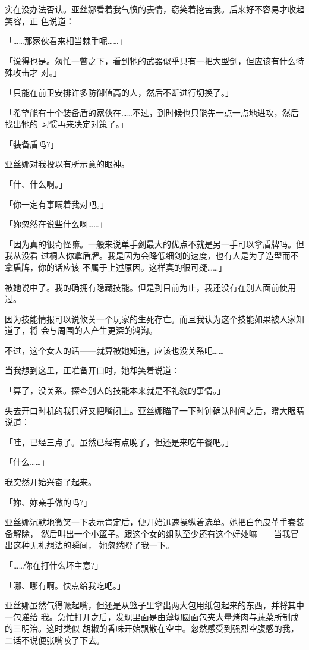 \documentclass[11pt]{book}
\begin{document}
实在没办法否认。亚丝娜看着我气愤的表情，窃笑着挖苦我。后来好不容易才收起笑容，正
色说道：

「……那家伙看来相当棘手呢……」

「说得也是。匆忙一瞥之下，看到牠的武器似乎只有一把大型剑，但应该有什么特殊攻击才
对。」

「只能在前卫安排许多防御值高的人，然后不断进行切换了。」

「希望能有十个装备盾的家伙在……不过，到时候也只能先一点一点地进攻，然后找出牠的
习惯再来决定对策了。」

「装备盾吗?」

亚丝娜对我投以有所示意的眼神。

「什、什么啊。」

「你一定有事瞒着我对吧。」

「妳忽然在说些什么啊……」

「因为真的很奇怪嘛。一般来说单手剑最大的优点不就是另一手可以拿盾牌吗。但我从没看
过桐人你拿盾牌。我是因为会降低细剑的速度，也有人是为了造型而不拿盾牌，你的话应该
不属于上述原因。这样真的很可疑……」

被她说中了。我的确拥有隐藏技能。但是到目前为止，我还没有在别人面前使用过。

因为技能情报可以说攸关一个玩家的生死存亡。而且我认为这个技能如果被人家知道了，将
会与周围的人产生更深的鸿沟。

不过，这个女人的话——就算被她知道，应该也没关系吧……

当我想到这里，正准备开口时，她却笑着说道：

「算了，没关系。探查别人的技能本来就是不礼貌的事情。」

失去开口时机的我只好又把嘴闭上。亚丝娜瞄了一下时钟确认时间之后，瞪大眼睛说道：

「哇，已经三点了。虽然已经有点晚了，但还是来吃午餐吧。」

「什么……」

我突然开始兴奋了起来。

「妳、妳亲手做的吗?」

亚丝娜沉默地微笑一下表示肯定后，便开始迅速操纵着选单。她把白色皮革手套装备解除，
然后叫出一个小篮子。跟这个女的组队至少还有这个好处嘛——当我冒出这种无礼想法的瞬间，
她忽然瞪了我一下。

「……你在打什么坏主意?」

「哪、哪有啊。快点给我吃吧。」

亚丝娜虽然气得噘起嘴，但还是从篮子里拿出两大包用纸包起来的东西，并将其中一包递给
我。急忙打开之后，发现里面是由薄切圆面包夹大量烤肉与蔬菜所制成的三明治。这时类似
胡椒的香味开始飘散在空中。忽然感受到强烈空腹感的我，二话不说便张嘴咬了下去。
\end{document}
